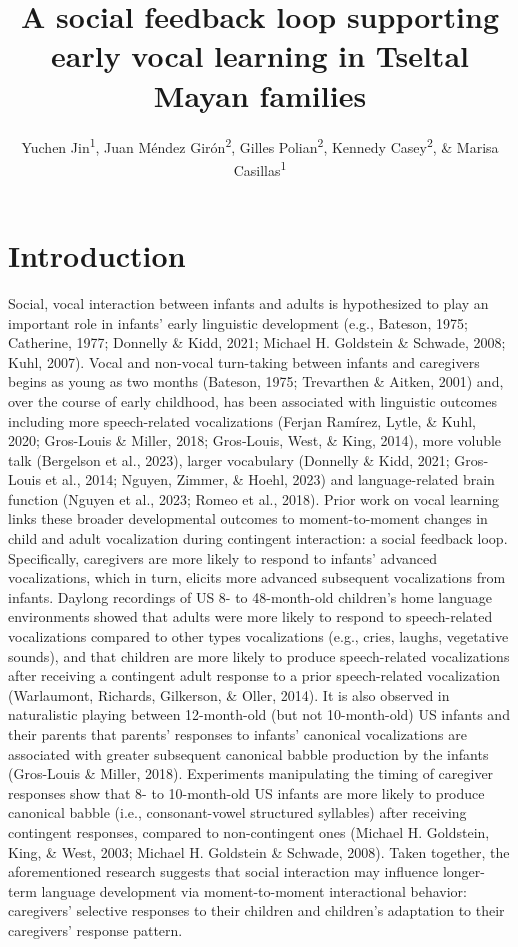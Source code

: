 \documentclass[
  man]{apa6}
\title{A social feedback loop supporting early vocal learning in Tseltal Mayan families}
\author{Yuchen Jin\textsuperscript{1}, Juan Méndez Girón\textsuperscript{2}, Gilles Polian\textsuperscript{2}, Kennedy Casey\textsuperscript{2}, \& Marisa Casillas\textsuperscript{1}}
\date{}
\affiliation{\vspace{0.5cm}\textsuperscript{1} Department of Comparative Human Development, University of Chicago\\\textsuperscript{2} Centro de Investigación y Estudios Superiores en Antropología Social Sureste\\\textsuperscript{3} Department of Psychology, Princeton University}
\begin{document}
\maketitle

\hypertarget{introduction}{%
\section{Introduction}\label{introduction}}

Social, vocal interaction between infants and adults is hypothesized to play an important role in infants' early linguistic development (e.g., Bateson, 1975; Catherine, 1977; Donnelly \& Kidd, 2021; Michael H. Goldstein \& Schwade, 2008; Kuhl, 2007). Vocal and non-vocal turn-taking between infants and caregivers begins as young as two months (Bateson, 1975; Trevarthen \& Aitken, 2001) and, over the course of early childhood, has been associated with linguistic outcomes including more speech-related vocalizations (Ferjan Ramírez, Lytle, \& Kuhl, 2020; Gros-Louis \& Miller, 2018; Gros‐Louis, West, \& King, 2014), more voluble talk (Bergelson et al., 2023), larger vocabulary (Donnelly \& Kidd, 2021; Gros‐Louis et al., 2014; Nguyen, Zimmer, \& Hoehl, 2023) and language-related brain function (Nguyen et al., 2023; Romeo et al., 2018). Prior work on vocal learning links these broader developmental outcomes to moment-to-moment changes in child and adult vocalization during contingent interaction: a social feedback loop. Specifically, caregivers are more likely to respond to infants' advanced vocalizations, which in turn, elicits more advanced subsequent vocalizations from infants. Daylong recordings of US 8- to 48-month-old children's home language environments showed that adults were more likely to respond to speech-related vocalizations compared to other types vocalizations (e.g., cries, laughs, vegetative sounds), and that children are more likely to produce speech-related vocalizations after receiving a contingent adult response to a prior speech-related vocalization (Warlaumont, Richards, Gilkerson, \& Oller, 2014). It is also observed in naturalistic playing between 12-month-old (but not 10-month-old) US infants and their parents that parents' responses to infants' canonical vocalizations are associated with greater subsequent canonical babble production by the infants (Gros-Louis \& Miller, 2018). Experiments manipulating the timing of caregiver responses show that 8- to 10-month-old US infants are more likely to produce canonical babble (i.e., consonant-vowel structured syllables) after receiving contingent responses, compared to non-contingent ones (Michael H. Goldstein, King, \& West, 2003; Michael H. Goldstein \& Schwade, 2008). Taken together, the aforementioned research suggests that social interaction may influence longer-term language development via moment-to-moment interactional behavior: caregivers' selective responses to their children and children's adaptation to their caregivers' response pattern.
\end{document}
